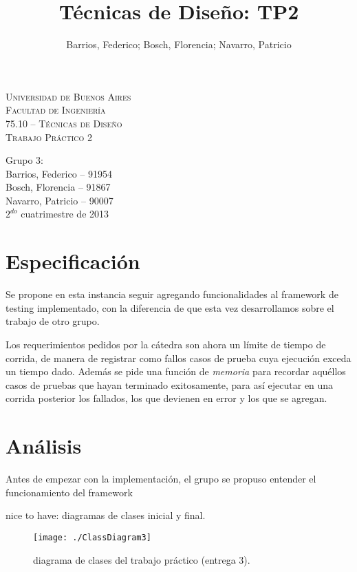 \documentclass[12pt]{article}
\title{Técnicas de Diseño: TP2}
\author{Barrios, Federico; Bosch, Florencia; Navarro, Patricio}
\begin{document}
\begin{center}
\vspace*{7 cm}
\textsc{\LARGE Universidad de Buenos Aires}\\[0.3cm]
\textsc{\LARGE Facultad de Ingeniería}\\[1.2cm]
\textsc{\Large 75.10 -- Técnicas de Diseño}\\[0.3cm]
\textsc{\Large Trabajo Práctico 2}\\[1.2cm]
\end{center}

\begin{flushright}
{\large
Grupo 3:\\[0.1cm]
Barrios, Federico -- 91954\\
Bosch, Florencia -- 91867\\
Navarro, Patricio -- 90007\\[0.4cm]
$2^{do}$ cuatrimestre de 2013}
\end{flushright}

\thispagestyle{empty}

\newpage

\tableofcontents
\setcounter{page}{1}
\newpage

\section{Especificación}
Se propone en esta instancia seguir agregando funcionalidades al framework de testing implementado,
con la diferencia de que esta vez desarrollamos sobre el trabajo de otro grupo. 

Los requerimientos 
pedidos por la cátedra son ahora un límite de tiempo de corrida, de manera de registrar como fallos
casos de prueba cuya ejecución exceda un tiempo dado. Además se pide una función de \textit{memoria}
para recordar aquéllos casos de pruebas que hayan terminado exitosamente, para así ejecutar en una
corrida posterior los fallados, los que devienen en error y los que se agregan.

\section{Análisis}
Antes de empezar con la implementación, el grupo se propuso entender el 
funcionamiento del framework 

nice to have: diagramas de clases inicial y final.
\begin{figure}[h!]
\begin{center}
	\texttt{[image: ./ClassDiagram3]}
\end{center}
	\caption{diagrama de clases del trabajo práctico (entrega 3).}
\end{figure}
\end{document}
